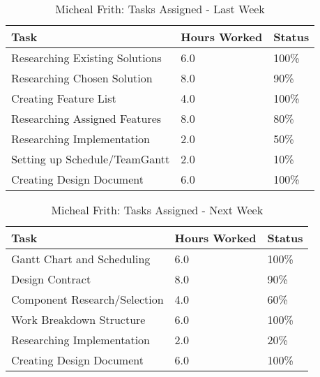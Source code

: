 \documentclass[12pt,article,compsoc]{IEEEtran}
\begin{document}
	\begin{table}[ht]
	\renewcommand{\arraystretch}{1.3}
		\caption{Micheal Frith: Tasks Assigned - Last Week}
		
		\label{Summary of Micheal Frith's activities: last week}
		
		\centering
		\begin{tabular}{p{5.5cm}|p{1cm}|p{1cm}}
		\hline
		\bfseries 	Task		 							& \bfseries Hours Worked	& \bfseries Status	\\
		\hline\hline
					Researching Existing Solutions			& 6.0						& 100\%				\\
					Researching Chosen Solution				& 8.0						& 90\%				\\
					Creating Feature List					& 4.0						& 100\%				\\	
					Researching Assigned Features           & 8.0                       & 80\%              \\
                    Researching Implementation				& 2.0						& 50\%				\\
					Setting up Schedule/TeamGantt			& 2.0						& 10\%				\\	
					Creating Design Document				& 6.0						& 100\%				\\
		\hline
		\end{tabular}
	\end{table}

    \begin{table}[ht]
	\renewcommand{\arraystretch}{1.3}
		\caption{Micheal Frith: Tasks Assigned - Next Week}
		
		\label{Summary of Micheal Frith's activities: this week}
		
		\centering
		\begin{tabular}{p{5.5cm}|p{1cm}|p{1cm}}
		\hline
		\bfseries 	Task		 		& \bfseries Hours Worked	& \bfseries Status	\\
		\hline\hline
    				Gantt Chart and Scheduling  			& 6.0						& 100\%				\\
					Design Contract         				& 8.0						& 90\%				\\
					Component Research/Selection			& 4.0						& 60\%				\\	
					Work Breakdown Structure                & 6.0                       & 100\%             \\
                    Researching Implementation				& 2.0						& 20\%				\\					
					Creating Design Document				& 6.0						& 100\%				\\
		\hline
		\end{tabular}
	\end{table}
\end{document}
